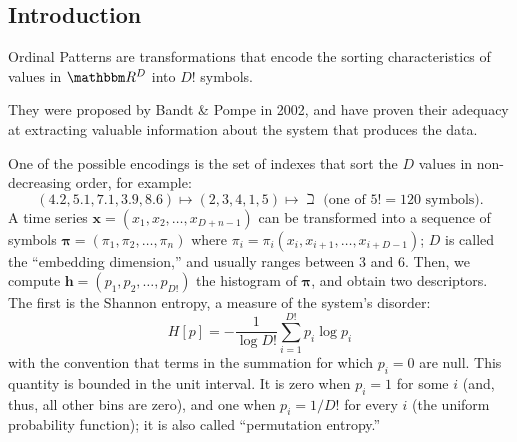 \documentclass[a0,portrait]{a0poster}
\begin{document}
\begin{mdframed}[style=MyFrame]

\begin{multicols}{2} %



\section{Introduction}

Ordinal Patterns are transformations that encode the sorting characteristics of values in $\mathbbm R^D$ into $D!$ symbols.

They were proposed by Bandt \& Pompe in 2002, and have proven their adequacy at extracting valuable information about the system that produces the data.

One of the possible encodings is the set of indexes that sort the $D$ values in non-decreasing order, for example:
$$
(4.2, 5.1, 7.1, 3.9, 8.6) \longmapsto (2, 3, 4, 1, 5) \longmapsto \beth \text{ (one of }5!=120 \text{ symbols)}.
$$
A time series $\bm x = (x_1,x_2,\dots,x_{D+n-1})$ can be transformed into a sequence of symbols $\bm \pi=(\pi_1,\pi_2,\dots,\pi_n)$ where $\pi_i=\pi_i(x_i,x_{i+1},\dots, x_{i+D-1})$; $D$ is called the ``embedding dimension,'' and usually ranges between $3$ and $6$.
Then, we compute $\bm h =(p_1,p_2,\dots,p_{D!})$ the histogram of $\bm \pi$, and obtain two descriptors.
The first is the Shannon entropy, a measure of the system's disorder:
\begin{equation}
    H[p]=-\frac{1}{\log D!}\sum_{i=1}^{D!}{p_i \log p_i}
    \label{eq:ShannonEntropy}
\end{equation}
with the convention that terms in the summation for which $p_i=0$ are null. This quantity is bounded in the unit interval. 
It is zero when $p_i=1$ for some $i$ (and, thus, all other bins are zero), and one when $p_i=1/D!$ for every $i$ (the uniform probability function); it is also called ``permutation entropy.''



\end{multicols}
\end{mdframed}
\end{document}

